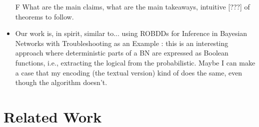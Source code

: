 \documentclass{article}
\theoremstyle{definition}
\theoremstyle{remark}
\begin{document}
\begin{itemize}
\begin{itemize}
  \end{itemize}
\item[F] What are the main claims, what are the main takeaways, intuitive [???]
  of theorems to follow.
\item Our work is, in spirit, similar to... using ROBDDs for Inference in
  Bayesian Networks with Troubleshooting as an Example
  \cite{DBLP:conf/uai/NielsenWJK00}: this is an interesting approach where
  deterministic parts of a BN are expressed as Boolean functions, i.e.,
  extracting the logical from the probabilistic. Maybe I can make a case that my
  encoding (the textual version) kind of does the same, even though the
  algorithm doesn't.
\end{itemize}

\section{Related Work}
\end{document}

